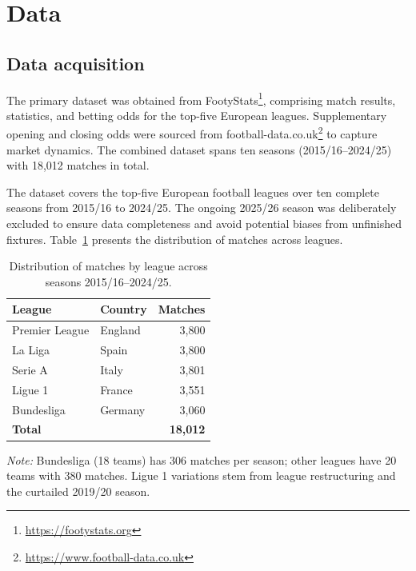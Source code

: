 \documentclass[pdflatex,sn-mathphys-num]{sn-jnl}
\theoremstyle{thmstyleone}
\theoremstyle{thmstyletwo}
\theoremstyle{thmstylethree}
\begin{document}
\section{Data}\label{sec:data}

\subsection{Data acquisition}

The primary dataset was obtained from FootyStats\footnote{\url{https://footystats.org}}, comprising match results, statistics, and betting odds for the top-five European leagues. Supplementary opening and closing odds were sourced from football-data.co.uk\footnote{\url{https://www.football-data.co.uk}} to capture market dynamics. The combined dataset spans ten seasons (2015/16--2024/25) with 18,012 matches in total.

The dataset covers the top-five European football leagues over ten complete seasons from 2015/16 to 2024/25. The ongoing 2025/26 season was deliberately excluded to ensure data completeness and avoid potential biases from unfinished fixtures. Table~\ref{tab:dataset} presents the distribution of matches across leagues.


\begin{table}[htbp]
\centering
\caption{Distribution of matches by league across seasons 2015/16--2024/25.}
\label{tab:dataset}
\begin{tabular}{@{}llr@{}}
\toprule
\textbf{League} & \textbf{Country} & \textbf{Matches} \\
\midrule
Premier League  & England & 3,800 \\
La Liga         & Spain   & 3,800 \\
Serie A         & Italy   & 3,801 \\
Ligue 1         & France  & 3,551 \\
Bundesliga      & Germany & 3,060 \\
\midrule
\textbf{Total}  &         & \textbf{18,012} \\
\bottomrule
\end{tabular}
\end{table}
\vspace{-8pt}
{\footnotesize\textit{Note:} Bundesliga (18 teams) has 306 matches per season; other leagues have 20 teams with 380 matches. Ligue 1 variations stem from league restructuring and the curtailed 2019/20 season.}
\end{document}
